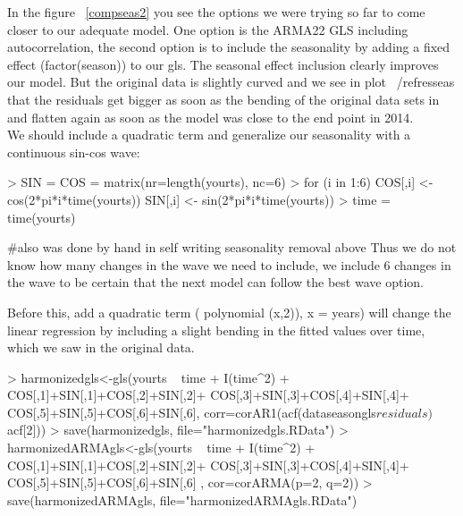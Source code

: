 \documentclass[11pt, a4paper]{article} %
\begin{document}
In the figure ~\ref{compseas2} you see the options we were trying so far to come closer to our adequate model. One option is the ARMA22 GLS including autocorrelation, the second option is to include the seasonality by adding a fixed effect (factor(season)) to our gls. 
The seasonal effect inclusion clearly improves our model. But the original data is slightly curved and we see in plot ~/ref{resseas} that the residuals get bigger as soon as the bending of the original data sets in and flatten again as soon as the model was close to the end point in 2014. \\

We should include a quadratic term and generalize our seasonality with a continuous sin-cos wave:\\

\begin{Schunk}
\begin{Sinput}
> SIN = COS = matrix(nr=length(yourts), nc=6)
> for (i in 1:6) {
   COS[,i] <- cos(2*pi*i*time(yourts))
   SIN[,i] <- sin(2*pi*i*time(yourts)) 
 }
> time = time(yourts)
\end{Sinput}
\end{Schunk}
#also was done by hand in self writing seasonality removal above
Thus we do not know how many changes in the wave we need to include, we include 6 changes in the wave to be certain that the next model can follow the best wave option. 

Before this, add a quadratic term ( polynomial (x,2)), x = years) will change the linear regression by including a slight bending in the fitted values over time, which we saw in the original data. 


\begin{Schunk}
\begin{Sinput}
> harmonizedgls<-gls(yourts ~ time + I(time^2) +
                     COS[,1]+SIN[,1]+COS[,2]+SIN[,2]+
                     COS[,3]+SIN[,3]+COS[,4]+SIN[,4]+
                     COS[,5]+SIN[,5]+COS[,6]+SIN[,6],
                   corr=corAR1(acf(dataseasongls$residuals)$acf[2]))
> save(harmonizedgls, file="harmonizedgls.RData")
> harmonizedARMAgls<-gls(yourts ~ time + I(time^2) +
                       COS[,1]+SIN[,1]+COS[,2]+SIN[,2]+
                       COS[,3]+SIN[,3]+COS[,4]+SIN[,4]+
                       COS[,5]+SIN[,5]+COS[,6]+SIN[,6]
                     , cor=corARMA(p=2, q=2))
> save(harmonizedARMAgls, file="harmonizedARMAgls.RData")
\end{Sinput}
\end{Schunk}
\end{document}
